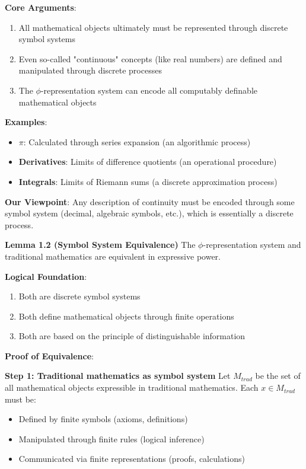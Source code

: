 \textbf{Core Arguments}:
\begin{enumerate}
\item All mathematical objects ultimately must be represented through discrete symbol systems
\item Even so-called "continuous" concepts (like real numbers) are defined and manipulated through discrete processes
\item The $\phi$-representation system can encode all computably definable mathematical objects
\end{enumerate}

\textbf{Examples}:
\begin{itemize}
\item \textbf{$\pi$}: Calculated through series expansion (an algorithmic process)
\item \textbf{Derivatives}: Limits of difference quotients (an operational procedure)
\item \textbf{Integrals}: Limits of Riemann sums (a discrete approximation process)
\end{itemize}

\textbf{Our Viewpoint}: Any description of continuity must be encoded through some symbol system (decimal, algebraic symbols, etc.), which is essentially a discrete process.

\textbf{Lemma 1.2 (Symbol System Equivalence)}
\label{lem:1.2}
The $\phi$-representation system and traditional mathematics are equivalent in expressive power.

\textbf{Logical Foundation}:
\begin{enumerate}
\item Both are discrete symbol systems
\item Both define mathematical objects through finite operations
\item Both are based on the principle of distinguishable information
\end{enumerate}

\textbf{Proof of Equivalence}:

\textbf{Step 1: Traditional mathematics as symbol system}
Let $M_{trad}$ be the set of all mathematical objects expressible in traditional mathematics.
Each $x \in M_{trad}$ must be:
\begin{itemize}
\item Defined by finite symbols (axioms, definitions)
\item Manipulated through finite rules (logical inference)
\item Communicated via finite representations (proofs, calculations)
\end{itemize}

